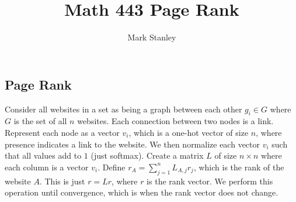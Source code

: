 \documentclass[11pt]{article}
\author{Mark Stanley}
\title{Math 443 Page Rank}
\begin{document}
    \lstset{style=mystyle}

    \maketitle

    \subsection{Page Rank}
    Consider all websites in a set as being a graph between each other $g_i \in G$
    where $G$ is the set of all $n$ websites.
    Each connection between two nodes is a link.
    Represent each node as a vector $v_i$, which is a one-hot vector of size $n$, where presence indicates a link to the website.
    We then normalize each vector $v_i$ such that all values add to $1$ (just softmax).
    Create a matrix $L$ of size $n \times n$ where each column is a vector $v_i$.
    Define $r_A = \sum^n_{j=1}L_{A,j}r_j$, which is the rank of the website $A$.
    This is just $r=Lr$, where $r$ is the rank vector.
    We perform this operation until convergence, which is when the rank vector does not change.
\end{document}
